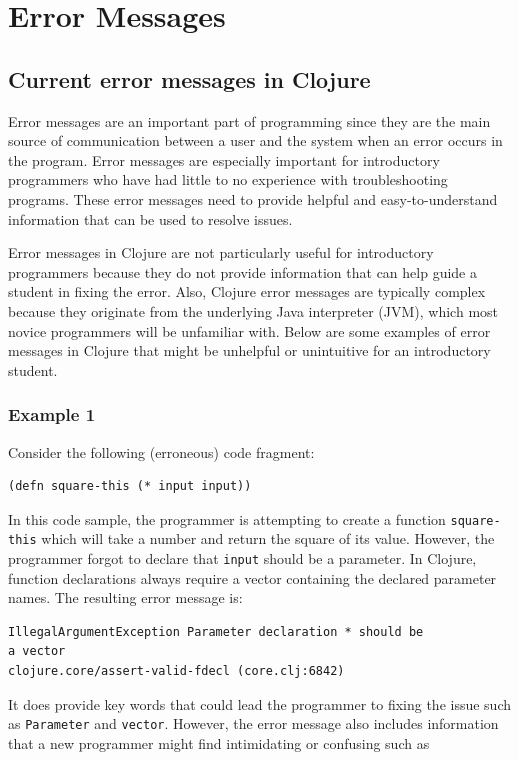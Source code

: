 \documentclass[12pt]{article}
\newcommand{\comment}[1]{{\bf \tt  {#1}}}
\newcommand{\emcomment}[1]{\textcolor{ForestGreen}{\comment{Elena: {#1}}}}
\begin{document}
\section{Error Messages}\label{sec:errors}

\subsection{Current error messages in Clojure}\label{sec:currentem}
Error messages are an important part of programming since they are the main source of communication between a user and the 
system when an error occurs in the program.
Error messages are especially important for introductory programmers who have had little to no experience with troubleshooting 
programs. %
These error messages need to provide helpful and easy-to-understand information that can be used to resolve issues.

Error messages in Clojure are not particularly useful for introductory programmers because they do not provide information that 
can help guide a student in fixing the error.
Also, Clojure error messages are typically complex because they originate from the underlying Java interpreter (JVM), which most 
novice programmers will be unfamiliar with.
Below are some examples of error messages in Clojure that might be unhelpful or unintuitive for an introductory student.

\subsubsection{Example 1}\label{sec:ex1}

Consider the following (erroneous) code fragment:
\begin{verbatim}
(defn square-this (* input input))
\end{verbatim}

In this code sample, the programmer is attempting to create a function \texttt{square-this} which will take a number and return 
the square of its value.
However, the programmer forgot to declare that \texttt{input} should be a parameter.
In Clojure, function declarations always require a vector containing the declared parameter names.
The resulting error message is: 
\begin{verbatim}
IllegalArgumentException Parameter declaration * should be 
a vector 
clojure.core/assert-valid-fdecl (core.clj:6842)
\end{verbatim}
It does provide key words that could lead the programmer to fixing the issue such as \texttt{Parameter} and \texttt{vector}.
However, the error message also includes information that a new programmer might find intimidating or confusing such as 
\end{document}

